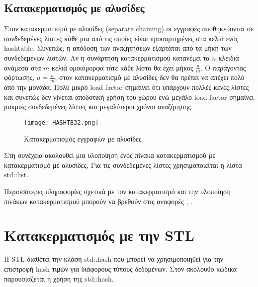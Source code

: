 

\subsection{Κατακερματισμός με αλυσίδες}
Στον κατακερματισμό με αλυσίδες (separate chaining) οι εγγραφές αποθηκεύονται σε συνδεδεμένες λίστες κάθε μια από τις οποίες είναι προσαρτημένες στα κελιά ενός hashtable. Συνεπώς, η απόδοση των αναζητήσεων εξαρτάται από τα μήκη των συνδεδεμένων λιστών. Αν η συνάρτηση κατακερματισμού κατανέμει τα $n$ κλειδιά ανάμεσα στα $m$ κελιά ομοιόμορφα τότε κάθε λίστα θα έχει μήκος $\frac{n}{m}$. O παράγοντας φόρτωσης, $a=\frac{n}{m}$, στον κατακερματισμό με αλυσίδες δεν θα πρέπει να απέχει πολύ από την μονάδα. Πολύ μικρό load factor σημαίνει ότι υπάρχουν πολλές κενές λίστες και συνεπώς δεν γίνεται αποδοτική χρήση του χώρου ενώ μεγάλο load factor σημαίνει μακριές συνδεδεμένες λίστες και μεγαλύτεροι χρόνοι αναζήτησης. 

\begin{figure}[ht]
\centering
\texttt{[image: HASHTB32.png]}
\caption{Κατακερματισμός εγγραφών με αλυσίδες \cite{wiki_hashtables}}
\label{fig:hashtable3}
\end{figure}

Στη συνέχεια ακολουθεί μια υλοποίηση ενός πίνακα κατακερματισμού με κατακερματισμό με αλυσίδες. Για τις συνδεδεμένες λίστες χρησιμοποιείται η λίστα std::list.





Περισσότερες πληροφορίες σχετικά με τον κατακερματισμό και την υλοποίηση πινάκων κατακερματισμού μπορούν να βρεθούν στις αναφορές \cite{pumpkin_hashtables}, \cite{hackerearth_hashtables}.

\section{Κατακερματισμός με την STL}
Η STL διαθέτει την κλάση std::hash που μπορεί να χρησιμοποιηθεί για την επιστροφή hash τιμών για διάφορους τύπους δεδομένων. Στον ακόλουθο κώδικα παρουσιάζεται η χρήση της std::hash.




 

